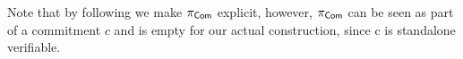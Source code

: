 \begin{remark}
Note that by following \cite{TCC:KatLosXu20} we make $\pi_{\mathsf{Com}}$ explicit, however, $\pi_{\mathsf{Com}}$ can be seen as part of a commitment $c$ and is empty for our actual construction, since c is standalone verifiable.  
\end{remark}


